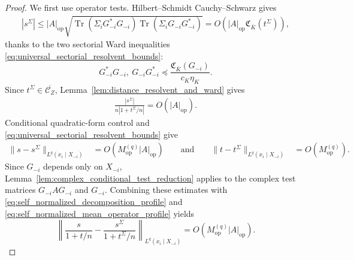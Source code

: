 \documentclass[EJP, preprint, NODS, nobera, nofontexpansion]{ejpecp}
\DeclareMathOperator{\op}{op}
\DeclareMathOperator{\tr}{Tr}
\begin{document}
\begin{proof}
We first use operator tests. Hilbert--Schmidt Cauchy--Schwarz gives
\begin{align*}
    |s^\Sigma|
    \leq
    |A|_{\op}
    \sqrt{
        \tr(\Sigma_iG_{-i}^*G_{-i})
        \tr(\Sigma_iG_{-i}G_{-i}^*)
    }
    =O\!\left(|A|_{\op}\mathfrak C_{\bar K}(t^\Sigma)\right),
\end{align*}
thanks to the two sectorial Ward inequalities
\eqref{eq:universal_sectorial_resolvent_bounds}:
\[
    G_{-i}^*G_{-i},\ G_{-i}G_{-i}^*
    \preceq
    \frac{\mathfrak C_{\bar K}(G_{-i})}
         {c_K\eta_K}.
\]
Since $t^\Sigma\in\overline{\mathcal C_Z}$,
Lemma~\ref{lem:distance_resolvent_and_ward} gives
\begin{align}\label{eq:self_normalized_mean_operator_profile}
    \frac{|s^\Sigma|}
         {n|1+t^\Sigma/n|}
    =O(|A|_{\op}).
\end{align}
Conditional quadratic-form control and
\eqref{eq:universal_sectorial_resolvent_bounds} give
\begin{align*}
    \|s-s^\Sigma\|_{L^q(x_i\mid X_{-i})}
    &=
    O\left(M_{\op}^{(q)}|A|_{\op}\right)
    \qquad \text{and}\qquad 
    \|t-t^\Sigma\|_{L^q(x_i\mid X_{-i})}
    &=
    O\left(M_{\op}^{(q)}\right).
\end{align*}
Since \(G_{-i}\) depends only on \(X_{-i}\),
Lemma~\ref{lem:complex_conditional_test_reduction}
applies to the complex test matrices \(G_{-i}AG_{-i}\) and \(G_{-i}\).  Combining these
estimates with
\eqref{eq:self_normalized_decomposition_profile} and
\eqref{eq:self_normalized_mean_operator_profile} yields
\[
    \left\|
        \frac{s}{1+t/n}
        -
        \frac{s^\Sigma}{1+t^\Sigma/n}
    \right\|_{L^q(x_i\mid X_{-i})}
    =
    O\left(M_{\op}^{(q)}|A|_{\op}\right).
\]


\end{proof}
\end{document}
